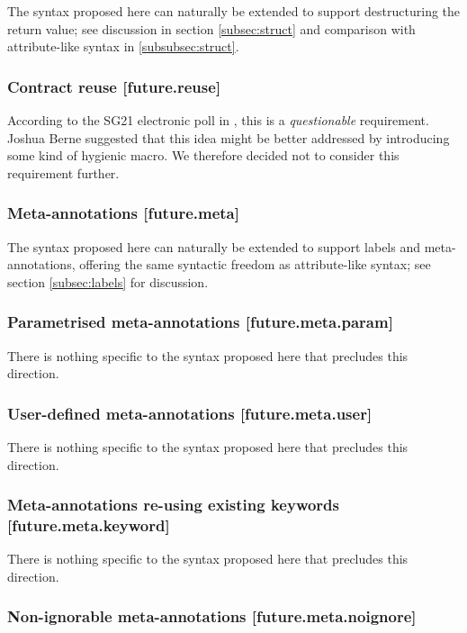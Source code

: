 The syntax proposed here can naturally be extended to support destructuring the return value; see discussion in section \ref{subsec:struct} and comparison with attribute-like syntax in \ref{subsubsec:struct}.

\subsubsection{Contract reuse  [future.reuse]}

According to the SG21 electronic poll in \cite{P2885R3}, this is a \emph{questionable} requirement. Joshua Berne suggested that this idea might be better addressed by introducing some kind of hygienic macro. We therefore decided not to consider this requirement further.

\subsubsection{Meta-annotations  [future.meta]}

The syntax proposed here can naturally be extended to support labels and meta-annotations, offering the same syntactic freedom as attribute-like syntax; see section \ref{subsec:labels} for discussion.

\subsubsection{Parametrised meta-annotations  [future.meta.param]}

There is nothing specific to the syntax proposed here that precludes this direction.

\subsubsection{User-defined meta-annotations  [future.meta.user]}

There is nothing specific to the syntax proposed here that precludes this direction.

\subsubsection{Meta-annotations re-using existing keywords  [future.meta.keyword]}

There is nothing specific to the syntax proposed here that precludes this direction.

\subsubsection{Non-ignorable meta-annotations  [future.meta.noignore]}

